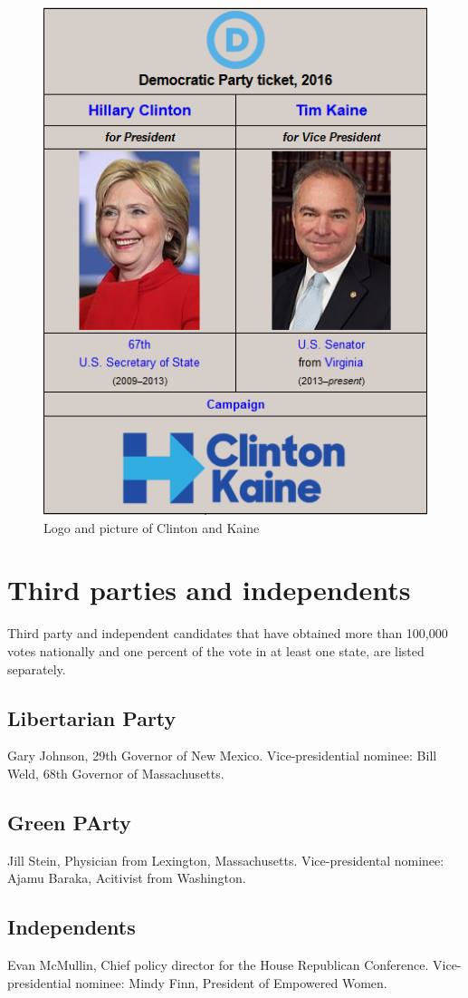 \begin{figure}[!h]
	\begin{center}
		\includegraphics[width=0.6\linewidth]{images/clinton}
		\caption{Logo and picture of Clinton and Kaine}
	\end{center}
\end{figure}

\newpage

\section{Third parties and independents}

Third party and independent candidates that have obtained more than 100,000 votes nationally and one percent of the vote in at least one state, are listed separately.

	\subsection{Libertarian Party}
	Gary Johnson, 29th Governor of New Mexico. Vice-presidential nominee: Bill Weld, 68th Governor of Massachusetts.
	
	\subsection{Green PArty}
	Jill Stein, Physician from Lexington, Massachusetts. Vice-presidental nominee: Ajamu Baraka, Acitivist from Washington.
	
	\subsection{Independents}
	Evan McMullin, Chief policy director for the House Republican Conference. Vice-presidential nominee: Mindy Finn, President of Empowered Women.
	

